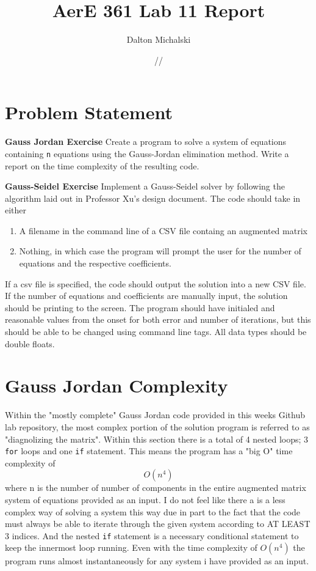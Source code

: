 \documentclass[11pt]{report}
\title{\textbf{AerE 361 Lab 11 Report}}
\author{Dalton Michalski}
\date{\oldstylenums{11}/\oldstylenums{6}/\oldstylenums{2018}}
\newcommand{\code}[1]{\colorbox{light-gray}{\texttt{#1}}}
\begin{document}
\maketitle
 
\section{Problem Statement}
\begin{item}
\item \textbf{Gauss Jordan Exercise} Create a program to solve a system of equations containing \code{n} equations using the Gauss-Jordan elimination method. Write a report on the time complexity of the resulting code.
\end{item}
\begin{item} 
\item \textbf{ Gauss-Seidel Exercise} Implement a Gauss-Seidel solver by following the algorithm laid out in Professor Xu’s design document. The code should take in either \begin{enumerate}
    \item A filename in the command line of a CSV file containg an augmented matrix
    \item Nothing, in which case the program will prompt the user for the number of equations and the respective coefficients.
\end{enumerate}
\item If a csv file is specified, the code should output the solution into a new CSV file. If the number of equations and coefficients are manually input, the solution should be printing to the screen. The program should have initialed and reasonable values from the onset for both error and number of iterations, but this should be able to be changed using command line tags. All data types should be double floats.
\end{item}
\section{Gauss Jordan Complexity}
\begin{outline}
\item Within the "mostly complete" Gauss Jordan code provided in this weeks Github lab repository, the most complex portion of the solution program is referred to as "diagnolizing the matrix". Within this section there is a total of 4 nested loops; 3 \code{for} loops and one \code{if} statement. This means the program has a "big O" time complexity of \begin{equation}
    O(n^4)
\end{equation}
where n is the number of number of components in the entire augmented matrix system of equations provided as an input. I do not feel like there a is a less complex way of solving a system this way due in part to the fact that the code must always be able to iterate through the given system according to AT LEAST 3 indices. And the nested \code{if} statement is a necessary conditional statement to keep the innermost loop running. Even with the time complexity of $O(n^4)$ the program runs almost instantaneously for any system i have provided as an input.
\end{outline}
\newpage
\end{document}
